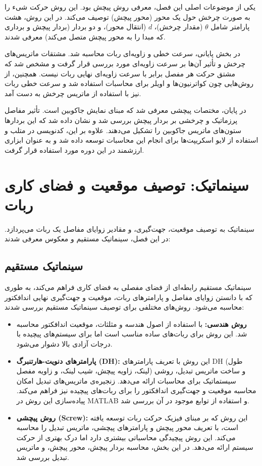 یکی از موضوعات اصلی این فصل، معرفی روش پیچش بود. این روش حرکت شیء را به صورت چرخش حول یک محور (محور پیچش) توصیف می‌کند. در این روش، هشت پارامتر شامل $\theta$ (مقدار چرخش)، $d$ (انتقال محور)، و دو بردار (بردار پیچش و برداری که مبدا را به محور پیچش متصل می‌کند) معرفی شدند.

در بخش پایانی، سرعت خطی و زاویه‌ای ربات محاسبه شد. مشتقات ماتریس‌های چرخش و تأثیر آن‌ها بر سرعت زاویه‌ای مورد بررسی قرار گرفت و مشخص شد که مشتق حرکت هر مفصل برابر با سرعت زاویه‌ای نهایی ربات نیست. همچنین، از روش‌هایی چون کواترنیون‌ها و اویلر برای محاسبات استفاده شد و سرعت خطی ربات نیز با استفاده از ماتریس چرخش به دست آمد. 

در پایان، مختصات پیچشی معرفی شد که مبنای نمایش جاکوبین است. تأثیر مفاصل پرزماتیک و چرخشی بر بردار پیچش بررسی شد و نشان داده شد که این بردارها ستون‌های ماتریس جاکوبین را تشکیل می‌دهند. علاوه بر این، کدنویسی در متلب و استفاده از لایو اسکریپت‌ها برای انجام این محاسبات توسعه داده شد و به عنوان ابزاری ارزشمند در این دوره مورد استفاده قرار گرفت.

\section*{سینماتیک: توصیف موقعیت و فضای کاری ربات}
سینماتیک به توصیف موقعیت، جهت‌گیری، و مقادیر زوایای مفاصل یک ربات می‌پردازد. در این فصل، سینماتیک مستقیم و معکوس معرفی شدند:

\subsection*{سینماتیک مستقیم}
سینماتیک مستقیم رابطه‌ای از فضای مفصلی به فضای کاری فراهم می‌کند، به طوری که با دانستن زوایای مفاصل و پارامترهای ربات، موقعیت و جهت‌گیری نهایی اندافکتور محاسبه می‌شود. روش‌های مختلفی برای توصیف سینماتیک مستقیم بررسی شدند:
\begin{itemize}
	\item \textbf{روش هندسی:} با استفاده از اصول هندسه و مثلثات، موقعیت اندافکتور محاسبه شد. این روش برای ربات‌های ساده مناسب است اما برای سیستم‌های پیچیده با درجات آزادی بالا دشوار می‌شود.
	\item \textbf{پارامترهای دنویت-هارتنبرگ (DH):} این روش با تعریف پارامترهای DH (طول لینک، زاویه پیچش، شیب لینک، و زاویه مفصل) و ساخت ماتریس تبدیل، روشی سیستماتیک برای محاسبات ارائه می‌دهد. زنجیره‌ی ماتریس‌های تبدیل امکان محاسبه موقعیت و جهت‌گیری اندافکتور را برای ربات‌های پیچیده نیز فراهم می‌کند. پیاده‌سازی این روش در MATLAB و استفاده از توابع موجود در آن بررسی شد.
	\item \textbf{روش پیچشی (Screw):} این روش که بر مبنای فیزیک حرکت ربات توسعه یافته است، با تعریف محور پیچش و پارامترهای پیچشی، ماتریس تبدیل را محاسبه می‌کند. این روش پیچیدگی محاسباتی بیشتری دارد اما درک بهتری از حرکت سیستم ارائه می‌دهد. در این بخش، محاسبه بردار پیچش، محور پیچش، و ماتریس تبدیل بررسی شد.
\end{itemize}

